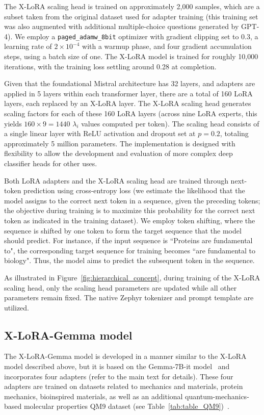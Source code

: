 The X-LoRA scaling head is trained on approximately 2,000 samples, which are a subset taken from the original dataset used for adapter training (this training set was also augmented with additional multiple-choice questions generated by GPT-4). We employ a \texttt{paged\_adamw\_8bit} optimizer with gradient clipping set to 0.3, a learning rate of $2\times 10^{-4}$ with a warmup phase, and four gradient accumulation steps, using a batch size of one. The X-LoRA model is trained for roughly 10,000 iterations, with the training loss settling around 0.28 at completion.

Given that the foundational Mistral architecture has 32 layers, and adapters are applied in 5 layers within each transformer layer, there are a total of 160 LoRA layers, each replaced by an X-LoRA layer. The X-LoRA scaling head generates scaling factors for each of these 160 LoRA layers (across nine LoRA experts, this yields $160 \times 9 = 1440$ $\lambda_i$ values computed per token). The scaling head consists of a single linear layer with ReLU activation and dropout set at $p=0.2$, totaling approximately 5 million parameters. The implementation is designed with flexibility to allow the development and evaluation of more complex deep classifier heads for other uses.

Both LoRA adapters and the X-LoRA scaling head are trained through next-token prediction using cross-entropy loss (we estimate the likelihood that the model assigns to the correct next token in a sequence, given the preceding tokens; the objective during training is to maximize this probability for the correct next token as indicated in the training dataset). We employ token shifting, where the sequence is shifted by one token to form the target sequence that the model should predict. For instance, if the input sequence is ``Proteins are fundamental to", the corresponding target sequence for training becomes ``are fundamental to biology". Thus, the model aims to predict the subsequent token in the sequence.

As illustrated in Figure~\ref{fig:hierarchical_concept}, during training of the X-LoRA scaling head, only the scaling head parameters are updated while all other parameters remain fixed. The native Zephyr tokenizer and prompt template are utilized.

\subsection{X-LoRA-Gemma model} The X-LoRA-Gemma model is developed in a manner similar to the X-LoRA model described above, but it is based on the Gemma-7B-it model~\cite{Google/gemma-7b-itFace} and incorporates four adapters (refer to the main text for details). These four adapters are trained on datasets related to mechanics and materials, protein mechanics, bioinspired materials, as well as an additional quantum-mechanics-based molecular properties QM9 dataset (see Table~\ref{tab:table_QM9})~\cite{Ruddigkeit2012EnumerationGDB-17,Ramakrishnan2015ElectronicSpace}.

